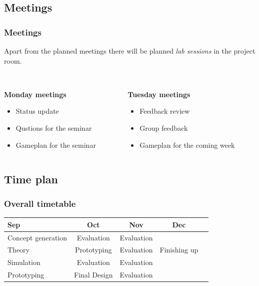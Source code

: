 \documentclass{beamer}
\begin{document}
\begin{frame}
    \subsection{Meetings}
    \frametitle{Meetings}
    Apart from the planned meetings there will be planned \textit{lab sessions} in
    the project room. 
    \\~\
    \begin{columns}

        \begin{column}[]{0.5\textwidth}
            \textbf{Monday meetings}
            \begin{itemize}
                \item Status update
                \item Qustions for the seminar
                \item Gameplan for the seminar
            \end{itemize}
        \end{column}

        \begin{column}[]{.5\textwidth}
            \textbf{Tuesday meetings}
            \begin{itemize}
                \item Feedback review
                \item Group feedback
                \item Gameplan for the coming week
            \end{itemize}
        \end{column}

    \end{columns}
\end{frame}

\begin{frame}
    \subsection{Time plan}
    \frametitle{Overall timetable}
    \begin{table}
        \begin{tabular}{| l | c | c | c | c }
            
            Sep & Oct & Nov & Dec \\
            \hline \hline
            Concept generation & Evaluation & Evaluation &  \\ 
            \hline
            Theory & Prototyping & Evaluation & Finishing up \\
            \hline
            Simulation & Evaluation & Evaluation & \\
            \hline
            Prototyping & Final Design & Evaluation &  \\
            \hline
 
        \end{tabular}
    \end{table}    
\end{frame}
\end{document}
